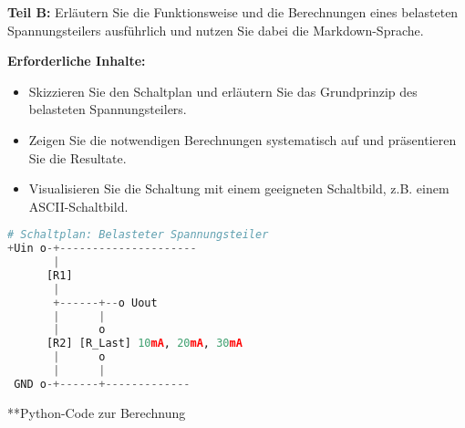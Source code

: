 \documentclass[12pt,a4paper]{scrartcl}
\newcommand{\tightlist}{
  \setlength{\itemsep}{0pt}\setlength{\parskip}{0pt}
}
\begin{document}
\textbf{Teil B:} Erläutern Sie die Funktionsweise und die Berechnungen
eines belasteten Spannungsteilers ausführlich und nutzen Sie dabei die
Markdown-Sprache.

\textbf{Erforderliche Inhalte:}

\begin{itemize}
\tightlist
\item
  Skizzieren Sie den Schaltplan und erläutern Sie das Grundprinzip des
  belasteten Spannungsteilers.
\item
  Zeigen Sie die notwendigen Berechnungen systematisch auf und
  präsentieren Sie die Resultate.
\item
  Visualisieren Sie die Schaltung mit einem geeigneten Schaltbild, z.B.
  einem ASCII-Schaltbild.
\end{itemize}

\begin{lstlisting}[language=Python]
# Schaltplan: Belasteter Spannungsteiler
+Uin o-+---------------------
       |
      [R1]
       |
       +------+--o Uout 
       |      |
       |      o
      [R2] [R_Last] 10mA, 20mA, 30mA
       |      o
       |      |
 GND o-+------+-------------
\end{lstlisting}

\newpage

**Python-Code zur Berechnung
\end{document}
